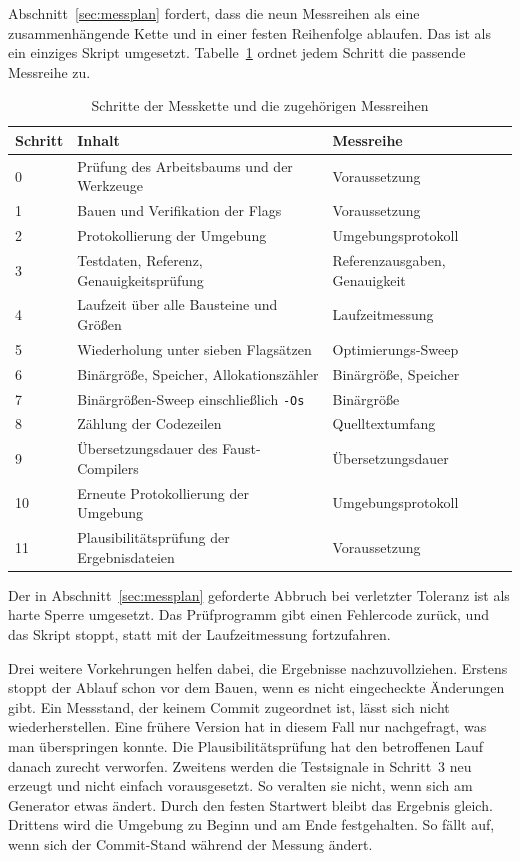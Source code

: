 Abschnitt~\ref{sec:messplan} fordert, dass die neun Messreihen als eine zusammenhängende Kette und in einer festen Reihenfolge ablaufen. Das ist als ein einziges Skript umgesetzt. Tabelle~\ref{tab:messkette} ordnet jedem Schritt die passende Messreihe zu.

\begin{table}[htb]
	\centering
	\small
	\caption{Schritte der Messkette und die zugehörigen Messreihen}
	\label{tab:messkette}
	\begin{tabular}{lll}
		\toprule
		Schritt & Inhalt & Messreihe \\
		\midrule
		0  & Prüfung des Arbeitsbaums und der Werkzeuge & Voraussetzung \\
		1  & Bauen und Verifikation der Flags           & Voraussetzung \\
		2  & Protokollierung der Umgebung               & Umgebungsprotokoll \\
		3  & Testdaten, Referenz, Genauigkeitsprüfung   & Referenzausgaben, Genauigkeit \\
		4  & Laufzeit über alle Bausteine und Größen    & Laufzeitmessung \\
		5  & Wiederholung unter sieben Flagsätzen       & Optimierungs-Sweep \\
		6  & Binärgröße, Speicher, Allokationszähler    & Binärgröße, Speicher \\
		7  & Binärgrößen-Sweep einschließlich \texttt{-Os} & Binärgröße \\
		8  & Zählung der Codezeilen                     & Quelltextumfang \\
		9  & Übersetzungsdauer des Faust-Compilers      & Übersetzungsdauer \\
		10 & Erneute Protokollierung der Umgebung       & Umgebungsprotokoll \\
		11 & Plausibilitätsprüfung der Ergebnisdateien  & Voraussetzung \\
		\bottomrule
	\end{tabular}
\end{table}

Der in Abschnitt~\ref{sec:messplan} geforderte Abbruch bei verletzter Toleranz ist als harte Sperre umgesetzt. Das Prüfprogramm gibt einen Fehlercode zurück, und das Skript stoppt, statt mit der Laufzeitmessung fortzufahren.

Drei weitere Vorkehrungen helfen dabei, die Ergebnisse nachzuvollziehen. Erstens stoppt der Ablauf schon vor dem Bauen, wenn es nicht eingecheckte Änderungen gibt. Ein Messstand, der keinem Commit zugeordnet ist, lässt sich nicht wiederherstellen. Eine frühere Version hat in diesem Fall nur nachgefragt, was man überspringen konnte. Die Plausibilitätsprüfung hat den betroffenen Lauf danach zurecht verworfen. Zweitens werden die Testsignale in Schritt~3 neu erzeugt und nicht einfach vorausgesetzt. So veralten sie nicht, wenn sich am Generator etwas ändert. Durch den festen Startwert bleibt das Ergebnis gleich. Drittens wird die Umgebung zu Beginn und am Ende festgehalten. So fällt auf, wenn sich der Commit-Stand während der Messung ändert.

